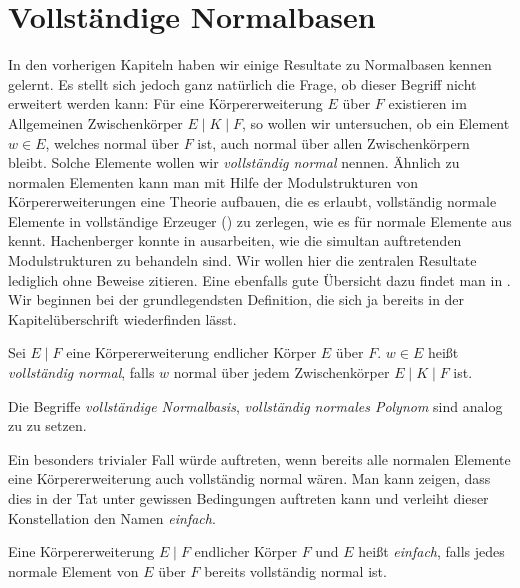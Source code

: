 \chapter{Vollständige Normalbasen}
\label{chap:vollst_normalbasen}

In den vorherigen Kapiteln haben wir einige Resultate zu Normalbasen kennen
gelernt. Es stellt sich jedoch ganz natürlich die Frage, ob dieser Begriff
nicht erweitert werden kann: Für eine Körpererweiterung $E$ über $F$ existieren
im Allgemeinen Zwischenkörper $E \mid K \mid F$, so wollen wir untersuchen,
ob ein Element $w \in E$, welches normal über $F$ ist, auch normal über allen
Zwischenkörpern bleibt. Solche Elemente wollen wir \emph{vollständig normal}
nennen. Ähnlich zu normalen Elementen kann man mit Hilfe der Modulstrukturen
von Körpererweiterungen eine Theorie aufbauen, die es erlaubt, vollständig
normale Elemente in vollständige Erzeuger () zu
zerlegen, wie es für normale Elemente aus 
kennt. Hachenberger konnte in \autocite{hachenberger1997finite} ausarbeiten, wie
die simultan auftretenden Modulstrukturen zu behandeln sind. Wir wollen hier
die zentralen Resultate lediglich ohne Beweise zitieren. Eine ebenfalls gute
Übersicht dazu findet man in \autocite[Section 5.4]{mullen2013handbook}.
Wir beginnen bei der grundlegendsten Definition, die sich ja bereits in der
Kapitelüberschrift wiederfinden lässt.

\begin{definition}
  \label{def:vollst_normal}
  Sei $E \mid F$ eine Körpererweiterung endlicher Körper $E$ über $F$.
  $w\in E$ heißt \emph{vollständig normal}, falls $w$ normal über jedem
  Zwischenkörper $E \mid K\mid F$ ist.

  Die Begriffe \emph{vollständige Normalbasis}, \emph{vollständig normales
  Polynom} sind analog zu  zu setzen.
\end{definition}

Ein besonders trivialer Fall würde auftreten, wenn bereits alle normalen
Elemente eine Körpererweiterung auch vollständig normal wären. Man kann zeigen,
dass dies in der Tat unter gewissen Bedingungen auftreten kann und verleiht
dieser Konstellation den Namen \emph{einfach}.

\begin{definition}[einfach]
  \label{def:einfach}
  Eine Körpererweiterung $E \mid F$ endlicher Körper $F$ und $E$ heißt 
  \emph{einfach}, falls jedes normale Element von $E$ über $F$ bereits
  vollständig normal ist.
\end{definition}


